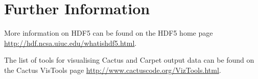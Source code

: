\documentclass{article}
\begin{document}
\section{Further Information}

More information on HDF5 can be found on the HDF5 home page
\url{http://hdf.ncsa.uiuc.edu/whatishdf5.html}.

The list of tools for visualising Cactus and Carpet output data can be found
on the Cactus VisTools page \url{http://www.cactuscode.org/VizTools.html}.

\end{document}
